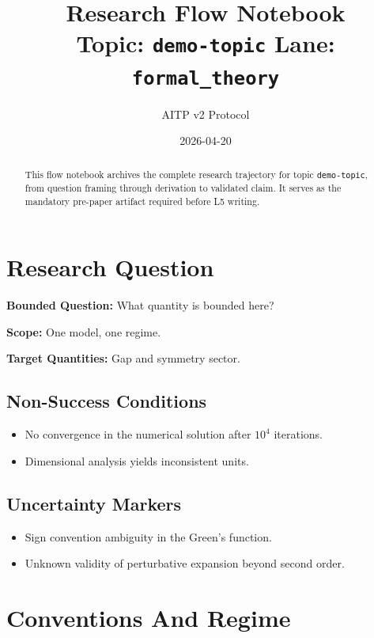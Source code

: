 \documentclass[11pt,a4paper]{article}
\title{\textbf{Research Flow Notebook}\\[0.5em]
\large Topic: \texttt{demo-topic} \quad Lane: \texttt{formal\_theory}}
\author{AITP v2 Protocol}
\date{2026-04-20}
\begin{document}
\maketitle

\begin{abstract}
This flow notebook archives the complete research trajectory for topic
\texttt{demo-topic}, from question framing through derivation to
validated claim. It serves as the mandatory pre-paper artifact required
before L5 writing.
\end{abstract}

\tableofcontents
\newpage

\section{Research Question}

\textbf{Bounded Question:} What quantity is bounded here?

\medskip
\noindent\textbf{Scope:} One model, one regime.

\noindent\textbf{Target Quantities:} Gap and symmetry sector.

\subsection{Non-Success Conditions}
\begin{itemize}
  \item No convergence in the numerical solution after $10^4$ iterations.
  \item Dimensional analysis yields inconsistent units.
\end{itemize}

\subsection{Uncertainty Markers}
\begin{itemize}
  \item Sign convention ambiguity in the Green's function.
  \item Unknown validity of perturbative expansion beyond second order.
\end{itemize}

\section{Conventions And Regime}
\end{document}

